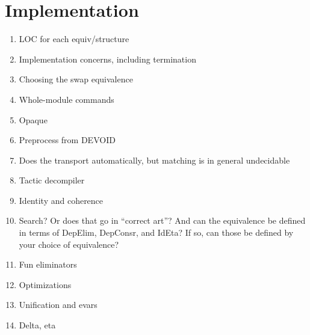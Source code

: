 \section{Implementation}
\label{sec:implementation}

\begin{enumerate}
\item LOC for each equiv/structure
\item Implementation concerns, including termination
\item Choosing the swap equivalence
\item Whole-module commands
\item Opaque
\item Preprocess from DEVOID
\item Does the transport automatically, but matching is in general undecidable
\item Tactic decompiler
\item Identity and coherence
\item Search? Or does that go in ``correct art''? And can the equivalence be defined in terms of DepElim, DepConsr, and IdEta? If so, can those be defined by your
      choice of equivalence?
\item Fun eliminators
\item Optimizations
\item Unification and evars
\item Delta, eta
\end{enumerate}
